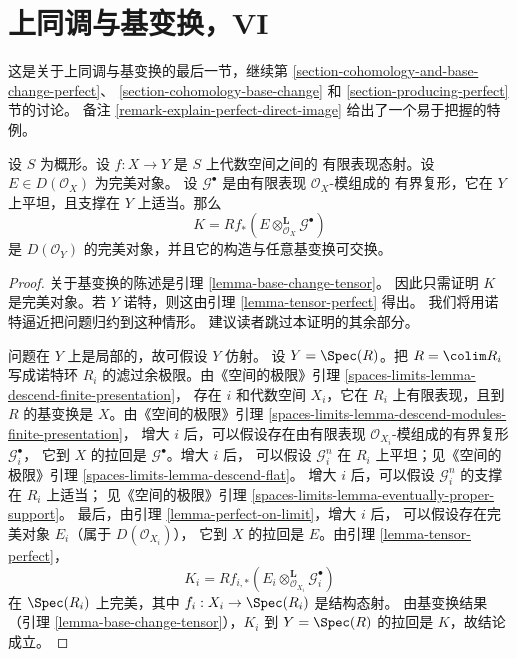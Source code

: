 \section{上同调与基变换，VI}
\label{section-cohomology-and-base-change-final}

\noindent
这是关于上同调与基变换的最后一节，继续第
\ref{section-cohomology-and-base-change-perfect}、
\ref{section-cohomology-base-change} 和
\ref{section-producing-perfect} 节的讨论。
备注 \ref{remark-explain-perfect-direct-image} 给出了一个易于把握的特例。

\begin{lemma}
\label{lemma-base-change-tensor-perfect}
设 $S$ 为概形。设 $f : X \to Y$ 是 $S$ 上代数空间之间的
有限表现态射。设 $E \in D(\mathcal{O}_X)$ 为完美对象。
设 $\mathcal{G}^\bullet$ 是由有限表现 $\mathcal{O}_X$-模组成的
有界复形，它在 $Y$ 上平坦，且支撑在 $Y$ 上适当。那么
$$
K = Rf_*(E \otimes_{\mathcal{O}_X}^\mathbf{L} \mathcal{G}^\bullet)
$$
是 $D(\mathcal{O}_Y)$ 的完美对象，并且它的构造与任意基变换可交换。
\end{lemma}

\begin{proof}
关于基变换的陈述是引理 \ref{lemma-base-change-tensor}。
因此只需证明 $K$ 是完美对象。若 $Y$ 诺特，则这由引理
\ref{lemma-tensor-perfect} 得出。
我们将用诺特逼近把问题归约到这种情形。
建议读者跳过本证明的其余部分。

\medskip\noindent
问题在 $Y$ 上是局部的，故可假设 $Y$ 仿射。
设 $Y = \Spec(R)$。把 $R = \colim R_i$ 写成诺特环
$R_i$ 的滤过余极限。由《空间的极限》引理
\ref{spaces-limits-lemma-descend-finite-presentation}，
存在 $i$ 和代数空间 $X_i$，它在 $R_i$ 上有限表现，且到
$R$ 的基变换是 $X$。由《空间的极限》引理
\ref{spaces-limits-lemma-descend-modules-finite-presentation}，
增大 $i$ 后，可以假设存在由有限表现
$\mathcal{O}_{X_i}$-模组成的有界复形 $\mathcal{G}_i^\bullet$，
它到 $X$ 的拉回是 $\mathcal{G}^\bullet$。增大 $i$ 后，
可以假设 $\mathcal{G}_i^n$ 在 $R_i$ 上平坦；见《空间的极限》引理
\ref{spaces-limits-lemma-descend-flat}。
增大 $i$ 后，可以假设 $\mathcal{G}_i^n$ 的支撑在 $R_i$ 上适当；
见《空间的极限》引理
\ref{spaces-limits-lemma-eventually-proper-support}。
最后，由引理 \ref{lemma-perfect-on-limit}，增大 $i$ 后，
可以假设存在完美对象 $E_i$（属于 $D(\mathcal{O}_{X_i})$），
它到 $X$ 的拉回是 $E$。由引理 \ref{lemma-tensor-perfect}，
$$
K_i =
Rf_{i, *}(E_i \otimes_{\mathcal{O}_{X_i}}^\mathbf{L} \mathcal{G}_i^\bullet)
$$
在 $\Spec(R_i)$ 上完美，其中 $f_i : X_i \to \Spec(R_i)$ 是结构态射。
由基变换结果（引理 \ref{lemma-base-change-tensor}），$K_i$ 到
$Y = \Spec(R)$ 的拉回是 $K$，故结论成立。
\end{proof}

